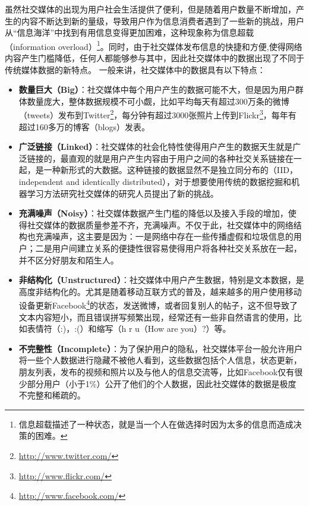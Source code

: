虽然社交媒体的出现为用户社会生活提供了便利，但是随着用户数量不断增加，产生的内容不断达到新的量级，导致用户作为信息消费者遇到了一些新的挑战，用户从“信息海洋”中找到有用信息变得更加困难，这种现象称为信息超载（information overload）\footnote{信息超载描述了一种状态，就是当一个人在做选择时因为太多的信息而造成决策的困难。}。同时，由于社交媒体发布信息的快捷和方便,使得网络内容产生门槛降低，任何人都能够参与其中，因此社交媒体中的数据出现了不同于传统媒体数据的新特点。
一般来讲，社交媒体中的数据具有以下特点：
\begin{itemize}
\item \textbf{数量巨大（Big）}：社交媒体中每个用户产生的数据可能不大，但是因为用户群体数量庞大，整体数据规模不可小觑，比如平均每天有超过300万条的微博（tweets）发布到Twitter\footnote{\url{http://www.twitter.com/}}，每分钟有超过3000张照片上传到Flickr\footnote{\url{http://www.flickr.com/}}，每年有超过160多万的博客（blogs）发表。
\item \textbf{广泛链接（Linked）}：社交媒体的社会化特性使得用户产生的数据天生就是广泛链接的，最直观的就是用户产生内容由于用户之间的各种社交关系链接在一起，是一种新形式的大数据。这种链接的数据显然不是独立同分布的（IID，independent and identically distributed），对于想要使用传统的数据挖掘和机器学习方法研究社交媒体的研究人员提出了新的挑战。
\item \textbf{充满噪声（Noisy）}：社交媒体数据产生门槛的降低以及接入手段的增加，使得社交媒体的数据质量参差不齐，充满噪声。不仅于此，社交媒体中的网络结构也充满噪声，这主要是因为：一是网络中存在一些传播虚假和垃圾信息的用户；二是用户间建立关系的便捷性很容易使得用户将各种社交关系放在一起，并不区分好朋友和陌生人。
\item \textbf{非结构化（Unstructured）}：社交媒体中用户产生数据，特别是文本数据，是高度非结构化的。尤其是随着移动互联方式的普及，越来越多的用户使用移动设备更新Facebook\footnote{\url{http://www.facebook.com/}}的状态，发送微博，或者回复别人的帖子，这不但导致了文本内容短小，而且错误拼写频繁出现，经常还有一些非自然语言的使用，比如表情符（:)，:(）和缩写（h r u（How are you）?）等。
\item \textbf{不完整性（Incomplete）}：为了保护用户的隐私，社交媒体平台一般允许用户将一些个人数据进行隐藏不被他人看到，这些数据包括个人信息，状态更新，朋友列表，发布的视频和照片以及与他人的信息交流等，比如Facebook仅有很少部分用户（小于1\%）公开了他们的个人数据，因此社交媒体的数据是极度不完整和稀疏的。
\end{itemize}

